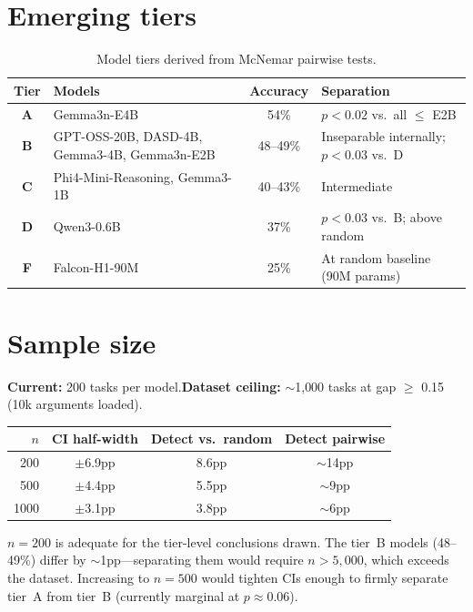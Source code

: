 \documentclass[11pt,a4paper]{article}
\begin{document}
\section{Emerging tiers}

\begin{table}[h]
\centering
\caption{Model tiers derived from McNemar pairwise tests.}
\vspace{4pt}
\begin{tabular}{@{}clcl@{}}
\toprule
\textbf{Tier} & \textbf{Models} & \textbf{Accuracy} & \textbf{Separation} \\
\midrule
\textcolor{tierA}{\textbf{A}} & Gemma3n-E4B & 54\% & $p < 0.02$ vs.\ all $\leq$ E2B \\
\textcolor{tierB}{\textbf{B}} & GPT-OSS-20B, DASD-4B, Gemma3-4B, Gemma3n-E2B & 48--49\% & Inseparable internally; $p < 0.03$ vs.\ D \\
\textcolor{tierC}{\textbf{C}} & Phi4-Mini-Reasoning, Gemma3-1B & 40--43\% & Intermediate \\
\textcolor{tierD}{\textbf{D}} & Qwen3-0.6B & 37\% & $p < 0.03$ vs.\ B; above random \\
\textcolor{tierF}{\textbf{F}} & Falcon-H1-90M & 25\% & At random baseline (90M params) \\
\bottomrule
\end{tabular}
\label{tab:tiers}
\end{table}

\section{Sample size}

\textbf{Current:} 200 tasks per model.\enspace\textbf{Dataset ceiling:} $\sim$1{,}000 tasks at gap $\geq$ 0.15 (10k arguments loaded).

\begin{table}[h]
\centering
\small
\begin{tabular}{@{}rccc@{}}
\toprule
$n$ & CI half-width & Detect vs.\ random & Detect pairwise \\
\midrule
200  & $\pm$6.9pp & 8.6pp & $\sim$14pp \\
500  & $\pm$4.4pp & 5.5pp & $\sim$9pp \\
1000 & $\pm$3.1pp & 3.8pp & $\sim$6pp \\
\bottomrule
\end{tabular}
\end{table}

$n = 200$ is adequate for the tier-level conclusions drawn. The tier~B models (48--49\%) differ by $\sim$1pp---separating them would require $n > 5{,}000$, which exceeds the dataset.
Increasing to $n = 500$ would tighten CIs enough to firmly separate tier~A from tier~B (currently marginal at $p \approx 0.06$).
\end{document}
